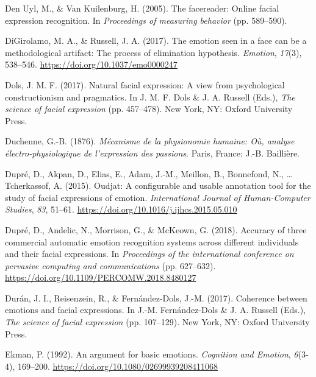 \documentclass[
  english,
  doc]{apa7}
\newlength{\cslhangindent}
\newenvironment{cslreferences}%
  {\setlength{\parindent}{0pt}%
  \everypar{\setlength{\hangindent}{\cslhangindent}}\ignorespaces}%
  {\par}
\begin{document}
\begin{cslreferences}
\leavevmode\hypertarget{ref-den2005facereader}{}%
Den Uyl, M., \& Van Kuilenburg, H. (2005). The facereader: Online facial expression recognition. In \emph{Proceedings of measuring behavior} (pp. 589--590).

\leavevmode\hypertarget{ref-digirolamo2017emotion}{}%
DiGirolamo, M. A., \& Russell, J. A. (2017). The emotion seen in a face can be a methodological artifact: The process of elimination hypothesis. \emph{Emotion}, \emph{17}(3), 538--546. \url{https://doi.org/10.1037/emo0000247}

\leavevmode\hypertarget{ref-dols2017natural}{}%
Dols, J. M. F. (2017). Natural facial expression: A view from psychological constructionism and pragmatics. In J. M. F. Dols \& J. A. Russell (Eds.), \emph{The science of facial expression} (pp. 457--478). New York, NY: Oxford University Press.

\leavevmode\hypertarget{ref-duchenne1876mecanisme}{}%
Duchenne, G.-B. (1876). \emph{Mécanisme de la physionomie humaine: Où, analyse électro-physiologique de l'expression des passions}. Paris, France: J.-B. Baillière.

\leavevmode\hypertarget{ref-dupre2015oudjat}{}%
Dupré, D., Akpan, D., Elias, E., Adam, J.-M., Meillon, B., Bonnefond, N., \ldots{} Tcherkassof, A. (2015). Oudjat: A configurable and usable annotation tool for the study of facial expressions of emotion. \emph{International Journal of Human-Computer Studies}, \emph{83}, 51--61. \url{https://doi.org/10.1016/j.ijhcs.2015.05.010}

\leavevmode\hypertarget{ref-dupre2018accuracy}{}%
Dupré, D., Andelic, N., Morrison, G., \& McKeown, G. (2018). Accuracy of three commercial automatic emotion recognition systems across different individuals and their facial expressions. In \emph{Proceedings of the international conference on pervasive computing and communications} (pp. 627--632). \url{https://doi.org/10.1109/PERCOMW.2018.8480127}

\leavevmode\hypertarget{ref-duran2017coherence}{}%
Durán, J. I., Reisenzein, R., \& Fernández-Dols, J.-M. (2017). Coherence between emotions and facial expressions. In J.-M. Fernández-Dols \& J. A. Russell (Eds.), \emph{The science of facial expression} (pp. 107--129). New York, NY: Oxford University Press.

\leavevmode\hypertarget{ref-ekman1992argument}{}%
Ekman, P. (1992). An argument for basic emotions. \emph{Cognition and Emotion}, \emph{6}(3-4), 169--200. \url{https://doi.org/10.1080/02699939208411068}


\end{cslreferences}
\end{document}

